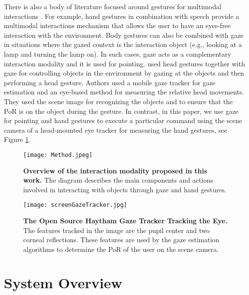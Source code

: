 \documentclass[jou,a4paper,notxfonts]{apa}
\begin{document}
There is also a body of literature focused around gestures for multimodal interactions \cite{starner2000gesture,schapira2001experimental,nickel2003pointing,Rozado2012}. For example, hand gestures in combination with speech provide a multimodal interactions mechanism that allows the user to have an eyes-free interaction with the environment. Body gestures can also be combined with gaze in situations where the gazed context is the interaction object (e.g., looking at a lamp and turning the lamp on). In such cases, gaze acts as a complementary interaction modality and it is used for pointing. \cite{mardanbegi2012eye} used head gestures together with gaze for controlling objects in the environment by gazing at the objects and then performing a head gesture. Authors used a mobile gaze tracker for gaze estimation and an eye-based method for measuring the relative head movements. They used the scene image for recognizing the objects and to ensure that the PoR is on the object during the gesture. In contrast, in this paper, we use gaze for pointing and hand gestures to execute a particular command using the scene camera of a head-mounted eye tracker for measuring the hand gestures, see Figure \ref{Method}.


\begin{figure}[tp]
 \texttt{[image: Method.jpeg]}
 \caption{\textbf{Overview of the interaction modality proposed in this work.} The diagram describes the main components and actions involved in interacting with objects through gaze and hand gestures.}
 \label{Method}
\end{figure}

 
\begin{figure}[tp]
 \texttt{[image: screenGazeTracker.jpg]}
 \caption{\textbf{The Open Source Haytham Gaze Tracker Tracking the Eye.} The
features tracked in the image are the pupil center and two corneal reflections. These features are 
used by the gaze estimation algorithms to determine the PoR of the user on the scene camera.}
 \label{screenGazeTracker}
\end{figure}

\section{System Overview}

\end{document}
